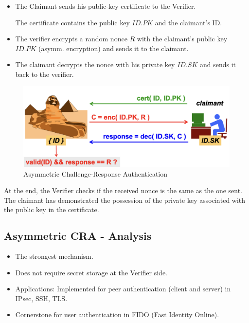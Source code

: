 \begin{multicols}{2}

    \begin{itemize}
        \item The Claimant sends his public-key certificate to the Verifier.
        
        The certificate contains the public key $ID.PK$ and the claimant's ID.
        \item The verifier encrypts a random nonce $R$ with the claimant's public key $ID.PK$ (asymm. encryption) and sends it to the claimant.
        \item The claimant decrypts the nonce with his private key $ID.SK$ and sends it back to the verifier.
    \end{itemize}

    \columnbreak
\begin{figure}[H]
    \centering
    \includegraphics[width=\linewidth]{Images/Authentication/asymmCRA.png}
    \caption{Asymmetric Challenge-Response Authentication}
\end{figure}

\end{multicols}

At the end, the Verifier checks if the received nonce is the same as the one sent. The claimant has demonstrated the possession of the private key associated with the public key in the certificate.

\subsection*{Asymmetric CRA - Analysis}
\begin{itemize}
    \item The strongest mechanism.
    \item Does not require secret storage at the Verifier side.
    \item Applications: Implemented for peer authentication (client and server) in IPsec, SSH, TLS.
    \item Cornerstone for user authentication in FIDO (Fast Identity Online).
\end{itemize}
